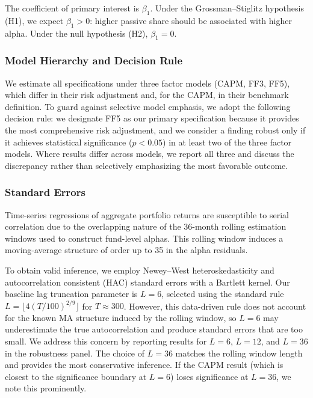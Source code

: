 \documentclass[11pt, a4paper]{article}
\begin{document}
The coefficient of primary interest is $\beta_1$. Under the Grossman--Stiglitz hypothesis (H1), we expect $\beta_1 > 0$: higher passive share should be associated with higher alpha. Under the null hypothesis (H2), $\beta_1 = 0$.

\subsubsection{Model Hierarchy and Decision Rule}
\label{subsub:model_hierarchy}

We estimate all specifications under three factor models (CAPM, FF3, FF5), which differ in their risk adjustment and, for the CAPM, in their benchmark definition. To guard against selective model emphasis, we adopt the following decision rule: we designate FF5 as our primary specification because it provides the most comprehensive risk adjustment, and we consider a finding robust only if it achieves statistical significance ($p < 0.05$) in at least two of the three factor models. Where results differ across models, we report all three and discuss the discrepancy rather than selectively emphasizing the most favorable outcome.

\subsubsection{Standard Errors}

Time-series regressions of aggregate portfolio returns are susceptible to serial correlation due to the overlapping nature of the 36-month rolling estimation windows used to construct fund-level alphas. This rolling window induces a moving-average structure of order up to 35 in the alpha residuals.

To obtain valid inference, we employ Newey--West heteroskedasticity and autocorrelation consistent (HAC) standard errors \parencite{newey1987} with a Bartlett kernel. Our baseline lag truncation parameter is $L = 6$, selected using the standard rule $L = \lfloor 4(T/100)^{2/9} \rfloor$ for $T \approx 300$. However, this data-driven rule does not account for the known MA structure induced by the rolling window, so $L = 6$ may underestimate the true autocorrelation and produce standard errors that are too small. We address this concern by reporting results for $L = 6$, $L = 12$, and $L = 36$ in the robustness panel. The choice of $L = 36$ matches the rolling window length and provides the most conservative inference. If the CAPM result (which is closest to the significance boundary at $L = 6$) loses significance at $L = 36$, we note this prominently.
\end{document}
